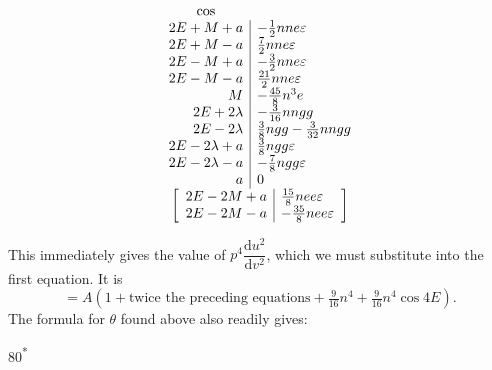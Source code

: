 \[
\begin{array}{r|l}
\multicolumn{1}{c}{\cos}&\\
2E+M+a&-\tfrac12nne\varepsilon\\
2E+M-a&\tfrac72nne\varepsilon\\
2E-M+a&-\tfrac32nne\varepsilon\\
2E-M-a&\tfrac{21}{2}nne\varepsilon\\
M&-\tfrac{45}{8}n^3e\\
2E+2\lambda&-\tfrac{3}{16}nngg\\
2E-2\lambda&\tfrac38ngg-\tfrac{3}{32}nngg\\
2E-2\lambda+a&\tfrac38ngg\varepsilon\\
2E-2\lambda-a&-\tfrac78ngg\varepsilon\\
a&0\\
\multicolumn{2}{c}{\left[\begin{array}{r|l}
2E-2M+a&\tfrac{15}{8}nee\varepsilon\\
2E-2M-a&-\tfrac{35}{8}nee\varepsilon
\end{array}\right]}
\end{array}
\]
\par\noindent\hspace*{\parindent}This immediately gives the value of \(p^4\dfrac{\mathrm du^2}{\mathrm dv^2}\), which we must substitute into the first
equation. It is
\[
=A(1+\text{twice the preceding equations}+\tfrac{9}{16}n^4+\tfrac{9}{16}n^4\cos4E).
\]
\noindent The formula for \(\theta\) found above also readily gives:\par
\nopagebreak
\vfill
\noindent\hfill80\textsuperscript{*}\par
\clearpage
\endgroup
